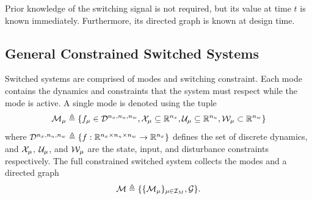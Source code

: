 Prior knowledge of the switching signal is not required, but its value at time $t$ is known immediately. Furthermore, its directed graph is known at design time. 
\subsection{General Constrained Switched Systems}
Switched systems  are comprised of \edit{}{\nummodes} modes and  switching constraint. Each mode contains the dynamics and constraints that the system must respect while the mode is active. A single mode is denoted using the tuple
\begin{equation}
\mode{\modeidx}\triangleq\{f_\modeidx\in \mathcal{D}^{\nx,\nu,\nw}, \xcon[\modeidx]\subseteq\real^\nx, \ucon[\modeidx]\subseteq\real^\nu, \wcon[\modeidx]\subset\real^\nw\}\nonumber
\end{equation}
where $\mathcal{D}^{{n_x},{n_u},{n_w}}\triangleq\{f:\mathbb{R}^{{n_x}\times{n_u}\times{n_w}}\rightarrow\mathbb{R}^{{n_x}}\}$ defines the set of discrete dynamics,  and $\xcon[\modeidx]$, $\ucon[\modeidx]$, and  $\wcon[\modeidx]$ are the state, input, and disturbance constraints respectively. The full constrained switched system collects the modes and a directed graph 
\begin{equation}\label{eq:basic_switched_sys}
\modes\triangleq\{\{\mode{\modeidx}\}_{\modeidx\in\idxset{\nummodes}}, \graph\}.
\end{equation}


